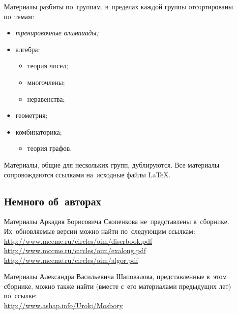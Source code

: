 Материалы разбиты по~группам, в~пределах каждой группы отсортированы по~темам:
\begin{itemize}
    \item \emph{тренировочные олимпиады;}
    \item алгебра;
    \begin{itemize}
        \item теория чисел;
        \item многочлены;
        \item неравенства;
    \end{itemize}
    \item геометрия;
    \item комбинаторика;
    \begin{itemize}
        \item теория графов.
    \end{itemize}
\end{itemize}

Материалы, общие для нескольких групп, дублируются.
\ifsourcelinks
Все материалы сопровождаются ссылками на~исходные файлы \LaTeX.
\fi


\subsection*{Немного об~авторах}

Материалы Аркадия Борисовича Скопенкова не~представлены в~сборнике.
Их~обновляемые версии можно найти по~следующим ссылкам:
\\
\url{http://www.mccme.ru/circles/oim/discrbook.pdf}
\\
\url{http://www.mccme.ru/circles/oim/exalong.pdf}
\\
\url{http://www.mccme.ru/circles/oim/algor.pdf}

Материалы Александра Васильевича Шаповалова, представленные в~этом сборнике,
можно также найти (вместе с~его материалами предыдущих лет) по~ссылке:
\\
\url{http://www.ashap.info/Uroki/Mosbory}

\endgroup %


